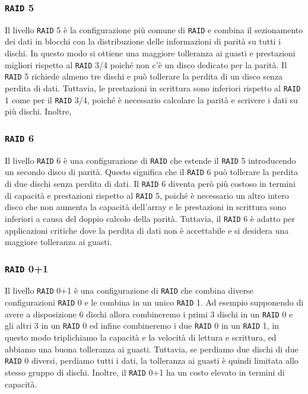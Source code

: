     \subsubsection{\texttt{RAID} 5}
        Il livello \texttt{RAID} 5 è la configurazione più comune di \texttt{RAID} e combina il sezionamento dei dati in blocchi con la distribuzione delle informazioni di parità su tutti i dischi. In questo modo si ottiene una maggiore tolleranza ai guasti e prestazioni migliori rispetto al \texttt{RAID} 3/4 poiché non c'è un disco dedicato per la parità. Il \texttt{RAID} 5 richiede almeno tre dischi e può tollerare la perdita di un disco senza perdita di dati. Tuttavia, le prestazioni in scrittura sono inferiori rispetto al \texttt{RAID} 1 come per il \texttt{RAID} 3/4, poiché è necessario calcolare la parità e scrivere i dati su più dischi. Inoltre, 
    \subsubsection{\texttt{RAID} 6}
        Il livello \texttt{RAID} 6 è una configurazione di \texttt{RAID} che estende il \texttt{RAID} 5 introducendo un secondo disco di parità. Questo significa che il \texttt{RAID} 6 può tollerare la perdita di due dischi senza perdita di dati. Il \texttt{RAID} 6 diventa però più costoso in termini di capacità e prestazioni rispetto al \texttt{RAID} 5, poiché è necessario un altro intero disco che non aumenta la capacità dell'array e le prestazioni in scrittura sono inferiori a causa del doppio calcolo della parità. Tuttavia, il \texttt{RAID} 6 è adatto per applicazioni critiche dove la perdita di dati non è accettabile e si desidera una maggiore tolleranza ai guasti.
    \subsubsection{\texttt{RAID} 0+1}
        Il livello \texttt{RAID} 0+1 è una configurazione di \texttt{RAID} che combina diverse configurazioni \texttt{RAID} 0 e le combina in un unico \texttt{RAID} 1. Ad esempio supponendo di avere a disposizione $6$ dischi allora combineremo i primi $3$ dischi in un \texttt{RAID} 0 e gli altri $3$ in un \texttt{RAID} 0 ed infine combineremo i due \texttt{RAID} 0 in un \texttt{RAID} 1, in questo modo triplichiamo la capacità e la velocità di lettura e scrittura, ed abbiamo una buona tolleranza ai guasti. Tuttavia, se perdiamo due dischi di due \texttt{RAID} 0 diversi, perdiamo tutti i dati, la tolleranza ai guasti è quindi limitata allo stesso gruppo di dischi. Inoltre, il \texttt{RAID} 0+1 ha un costo elevato in termini di capacità.
